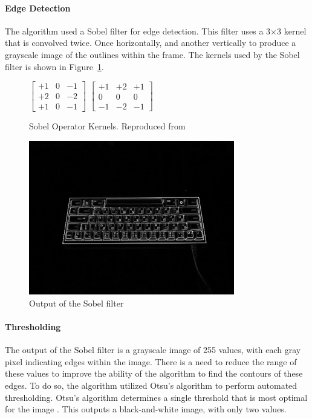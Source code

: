 \documentclass{report}
\begin{document}
\paragraph{Edge Detection}
The algorithm used a Sobel filter for edge detection. This filter uses a
3$\times$3 kernel that is convolved twice. Once horizontally, and another
vertically to produce a grayscale image of the outlines within the frame. The
kernels used by the Sobel filter \parencite{sobel2014} is shown in
Figure~\ref{fig:metho-algo-key-sobel}.

\begin{figure}[H]
	\centering
	$\begin{bmatrix}
			+1 & 0 & -1 \\
			+2 & 0 & -2 \\
			+1 & 0 & -1
		\end{bmatrix}$
	$\begin{bmatrix}
			+1 & +2 & +1 \\
			0  & 0  & 0  \\
			-1 & -2 & -1
		\end{bmatrix}$
	\caption{Sobel Operator Kernels. Reproduced from }
	\label{fig:metho-algo-key-sobel}
\end{figure}

\begin{figure}[H]
	\centering
	\includegraphics[width=0.8\textwidth]{sobel.png}
	\caption{Output of the Sobel filter}
	\centering
\end{figure}

\paragraph{Thresholding}
The output of the Sobel filter is a grayscale image of 255 values, with each
gray pixel indicating edges within the image. There is a need to reduce the
range of these values to improve the ability of the algorithm to find the
contours of these edges. To do so, the algorithm utilized Otsu's algorithm to
perform automated thresholding. Otsu's algorithm determines a single threshold
that is most optimal for the image \parencite{otsu}. This outputs a
black-and-white image, with only two values.
\end{document}
